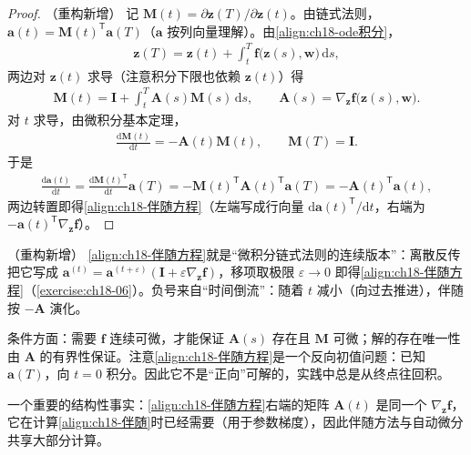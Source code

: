 \documentclass[../../main.tex]{subfiles}
\begin{document}
\begin{proof}（重构新增）
记 $\bm{M}(t)=\partial\bm{z}(T)/\partial\bm{z}(t)$。由链式法则，$\bm{a}(t)=\bm{M}(t)^{\mathsf T}\bm{a}(T)$（$\bm{a}$ 按列向量理解）。由\eqref{align:ch18-ode积分}，
\begin{align*}
  \bm{z}(T)=\bm{z}(t)+\int_{t}^{T}\bm{f}\big(\bm{z}(s),\bm{w}\big)\,\mathrm{d}s,
\end{align*}
两边对 $\bm{z}(t)$ 求导（注意积分下限也依赖 $\bm{z}(t)$）得
\begin{align*}
  \bm{M}(t)=\bm{I}+\int_{t}^{T}\bm{A}(s)\bm{M}(s)\,\mathrm{d}s,\qquad \bm{A}(s)=\nabla_{\bm{z}}\bm{f}\big(\bm{z}(s),\bm{w}\big).
\end{align*}
对 $t$ 求导，由微积分基本定理，
\begin{align*}
  \frac{\mathrm{d}\bm{M}(t)}{\mathrm{d}t}=-\bm{A}(t)\bm{M}(t),\qquad \bm{M}(T)=\bm{I}.
\end{align*}
于是
\begin{align*}
  \frac{\mathrm{d}\bm{a}(t)}{\mathrm{d}t}=\frac{\mathrm{d}\bm{M}(t)^{\mathsf T}}{\mathrm{d}t}\bm{a}(T)=-\bm{M}(t)^{\mathsf T}\bm{A}(t)^{\mathsf T}\bm{a}(T)=-\bm{A}(t)^{\mathsf T}\bm{a}(t),
\end{align*}
两边转置即得\eqref{align:ch18-伴随方程}（左端写成行向量 $\mathrm{d}\bm{a}(t)^{\mathsf T}/\mathrm{d}t$，右端为 $-\bm{a}(t)^{\mathsf T}\nabla_{\bm{z}}\bm{f}$）。
\end{proof}

\begin{remark}（重构新增）
\eqref{align:ch18-伴随方程}就是“微积分链式法则的连续版本”：离散反传把它写成 $\bm{a}^{(t)}=\bm{a}^{(t+\varepsilon)}(\bm{I}+\varepsilon\nabla_{\bm{z}}\bm{f})$，移项取极限 $\varepsilon\to0$ 即得\eqref{align:ch18-伴随方程}（\cref{exercise:ch18-06}）。负号来自“时间倒流”：随着 $t$ 减小（向过去推进），伴随按 $-\bm{A}$ 演化。

条件方面：需要 $\bm{f}$ 连续可微，才能保证 $\bm{A}(s)$ 存在且 $\bm{M}$ 可微；解的存在唯一性由 $\bm{A}$ 的有界性保证。注意\eqref{align:ch18-伴随方程}是一个反向初值问题：已知 $\bm{a}(T)$，向 $t=0$ 积分。因此它不是“正向”可解的，实践中总是从终点往回积。

一个重要的结构性事实：\eqref{align:ch18-伴随方程}右端的矩阵 $\bm{A}(t)$ 是同一个 $\nabla_{\bm{z}}\bm{f}$，它在计算\eqref{align:ch18-伴随}时已经需要（用于参数梯度），因此伴随方法与自动微分共享大部分计算。
\end{remark}
\end{document}
